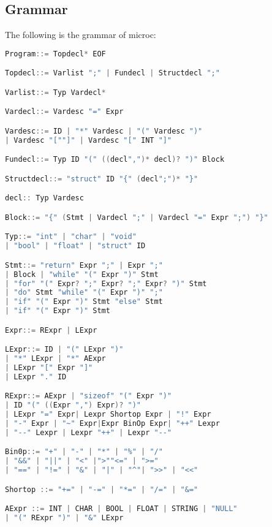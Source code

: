 \documentclass{article}
\begin{document}
\subsection{Grammar}
The following is the grammar of microc:
\begin{lstlisting}[language=C, basicstyle=\ttfamily\fontsize{8pt}{14pt}, keywordstyle=\color{blue}, commentstyle=\color{green}]
Program::= Topdecl* EOF

Topdecl::= Varlist ";" | Fundecl | Structdecl ";"

Varlist::= Typ Vardecl*

Vardecl::= Vardesc "=" Expr

Vardesc::= ID | "*" Vardesc | "(" Vardesc ")"
| Vardesc "[""]" | Vardesc "[" INT "]"

Fundecl::= Typ ID "(" ((decl",")* decl)? ")" Block

Structdecl::= "struct" ID "{" (decl";")* "}"

decl:: Typ Vardesc

Block::= "{" (Stmt | Vardecl ";" | Vardecl "=" Expr ";") "}"

Typ::= "int" | "char" | "void"
| "bool" | "float" | "struct" ID

Stmt::= "return" Expr ";" | Expr ";"
| Block | "while" "(" Expr ")" Stmt
| "for" "(" Expr? ";" Expr? ";" Expr? ")" Stmt
| "do" Stmt "while" "(" Expr ")" ";"
| "if" "(" Expr ")" Stmt "else" Stmt
| "if" "(" Expr ")" Stmt

Expr::= RExpr | LExpr

LExpr::= ID | "(" LExpr ")"
| "*" LExpr | "*" AExpr
| LExpr "[" Expr "]"
| LExpr "." ID

RExpr::= AExpr | "sizeof" "(" Expr ")"
| ID "(" ((Expr ",") Expr)? ")"
| LExpr "=" Expr| Lexpr Shortop Expr | "!" Expr
| "-" Expr | "~" Expr|Expr BinOp Expr| "++" Lexpr
| "--" Lexpr | Lexpr "++" | Lexpr "--"

Bin0p::= "+" | "-" | "*" | "%" | "/"
| "&&" | "||" | "<" |">""<=" | ">="
| "==" | "!=" | "&" | "|" | "^"| ">>" | "<<"

Shortop ::= "+=" | "-=" | "*=" | "/=" | "&="

AExpr ::= INT | CHAR | BOOL | FLOAT | STRING | "NULL"
| "(" RExpr ")" | "&" LExpr
\end{lstlisting}
\end{document}
